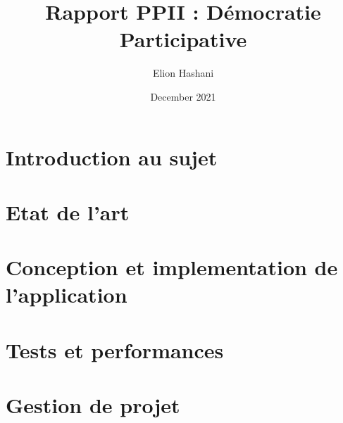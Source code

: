 \documentclass{article}
\title{Rapport PPII : Démocratie Participative}
\author{Elion Hashani }
\date{December 2021}
\begin{document}


\tableofcontents



\chapter{Introduction au sujet}


\chapter{Etat de l'art}



\chapter{Conception et implementation de l'application}



\chapter{Tests et performances}



\chapter{Gestion de projet}

\end{document}
